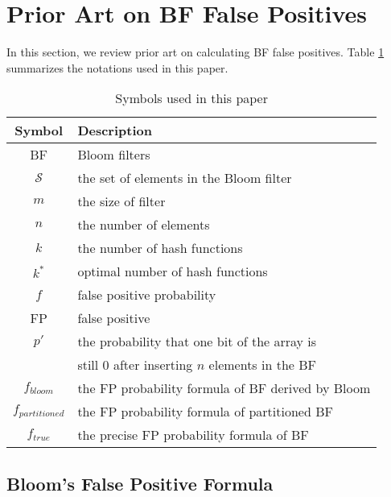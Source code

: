\presec \section{Prior Art on BF False Positives} \postsec \label{sec:priorarts}
%
In this section, we review prior art on calculating BF false positives.
%
Table \ref{table:symbols} summarizes the notations used in this paper.

\begin{table} [htbp]
\vspace{-0.15in}
\caption{Symbols used in this paper}
\centering
\label{table:symbols}
\begin{tabular}{| c | l |}
\hline Symbol & Description \\
\hline
       BF   & Bloom filters \\
\hline $\mathcal{S}$ & the set of elements in the Bloom filter \\
\hline $m$  & the size of filter \\
\hline $n$  & the number of elements \\
\hline $k$  & the number of hash functions \\
\hline $k^*$  & optimal number of hash functions \\
\hline $f$  & false positive probability \\
\hline FP   & false positive \\
\hline $p'$ & the probability that one bit of the array is \\
            & still 0 after inserting $n$ elements in the BF \\
\hline $f_{bloom}$ & the FP probability formula of BF derived by Bloom \\
\hline $f_{partitioned}$ & the FP probability formula of partitioned BF \\
\hline $f_{true}$        & the precise FP probability formula of BF\\
\hline
\end{tabular}
\end{table}

\presub \subsection{Bloom's False Positive Formula} \postsub
%


